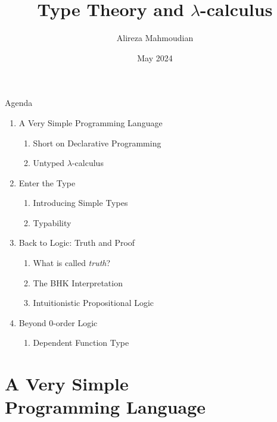 \documentclass{beamer}
\title{Type Theory and $\lambda$-calculus}
\author{Alireza Mahmoudian}
\institute{School of Mathematics,\\ Statistics and Computer Science\\ University of Tehran}
\date{May 2024}
\begin{document}
\begin{frame}
	\maketitle
\end{frame}

\def\secProg{A Very Simple Programming Language}
\def\subDec{Short on Declarative Programming}
\def\subLambda{Untyped $\lambda$-calculus}
\def\secType{Enter the Type}
\def\subSTLC{Introducing Simple Types}
\def\subTypability{Typability}
\def\secTruth{Back to Logic: Truth and Proof}
\def\subTruth{What is called \emph{truth}?}
\def\subBHK{The BHK Interpretation}
\def\subIntLog{Intuitionistic Propositional Logic}
\def\secDep{Beyond $0$-order Logic}
\def\subDepFun{Dependent Function Type}

\begin{frame}{Agenda}
	\begin{enumerate}
		\item \secProg
		\begin{enumerate}
			\item \subDec
			\item \subLambda
		\end{enumerate}
		\item \secType
		\begin{enumerate}
			\item \subSTLC
			\item \subTypability
		\end{enumerate}
		\item \secTruth
		\begin{enumerate}
			\item \subTruth
			\item \subBHK
			\item \subIntLog
		\end{enumerate}
		\item \secDep
		\begin{enumerate}
			\item \subDepFun
		\end{enumerate}
	\end{enumerate}
\end{frame}

\section{A Very Simple\\ Programming Language}
\end{document}

